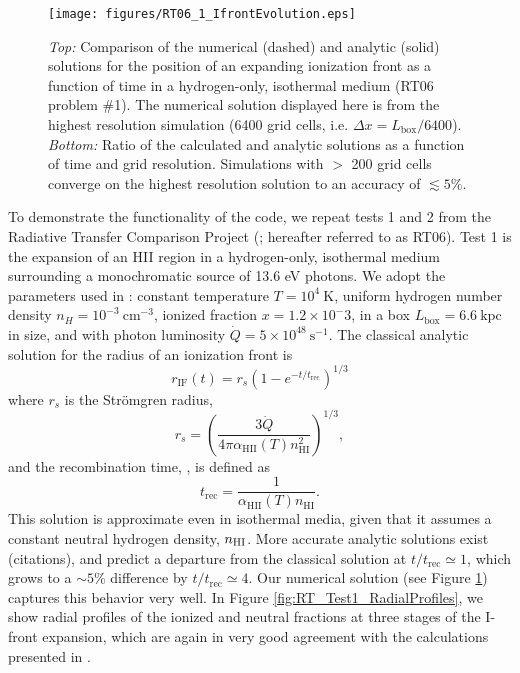 \documentclass[preprint2]{aastex}              %
\begin{document}
\begin{figure}[htbp]
\centering
\texttt{[image: figures/RT06\_1\_IfrontEvolution.eps]}
\caption{\textit{Top:} Comparison of the numerical (dashed) and analytic (solid) solutions for the position of an expanding ionization front as a function of time in a hydrogen-only, isothermal medium (RT06 problem \#1).  The numerical solution displayed here is from the highest resolution simulation (6400 grid cells, i.e. $\Delta x = L_{\mathrm{box}}/6400$). \textit{Bottom:} Ratio of the calculated and analytic solutions as a function of time and grid resolution.  Simulations with $>$ 200 grid cells converge on the highest resolution solution to an accuracy of $\lesssim 5 \%$.}
\label{fig:RT_Test1_IfrontEvolution}
\end{figure}

To demonstrate the functionality of the code, we repeat tests 1 and 2 from the Radiative Transfer Comparison Project (\cite{Iliev2006}; hereafter referred to as RT06).  Test 1 is the expansion of an HII region in a hydrogen-only, isothermal medium surrounding a monochromatic source of 13.6 eV photons. We adopt the parameters used in \citet{Wise2011}: constant temperature $T = 10^4 \ \mathrm{K}$, uniform hydrogen number density $n_H = 10^{-3} \ \mathrm{cm^{-3}}$, ionized fraction $x = 1.2 \times 10^-3$, in a box $L_{\mathrm{box}} = 6.6 \ \mathrm{kpc}$ in size, and with photon luminosity $\dot{Q} = 5\times10^{48} \ \mathrm{s^{-1}}$.  The classical analytic solution for the radius of an ionization front is 
\begin{equation}
    r_{\mathrm{IF}}(t) = r_s (1 - e^{-t/t_{\mathrm{rec}}})^{1/3}
\end{equation}    
where $r_s$ is the Str\"{o}mgren radius, 
\begin{equation}
    r_s = \left(\frac{3 \dot{Q}}{4\pi \alpha_{\mathrm{HII}}(T) n_{\mathrm{HI}}^2}\right)^{1/3} ,
\end{equation}
and the recombination time, \trec, is defined as
\begin{equation}
    t_{\mathrm{rec}} = \frac{1}{\alpha_{\mathrm{HII}}(T) n_{\mathrm{HI}}} .
\end{equation}
This solution is approximate even in isothermal media, given that it
assumes a constant neutral hydrogen density, $n_{\text{HI}}$. More accurate analytic
solutions exist (citations), and predict a departure from the classical
solution at $t/t_{\mathrm{rec}} \simeq 1$, which grows to a $\sim 5 \%$
difference by $t/t_{\mathrm{rec}} \simeq 4$. Our numerical solution (see
Figure \ref{fig:RT_Test1_IfrontEvolution}) captures this behavior very well.  In Figure \ref{fig:RT_Test1_RadialProfiles}, we show radial profiles of the ionized and neutral fractions at three stages of the I-front expansion, which are again in very good agreement with the calculations presented in \citet{Iliev2006}.
\end{document}
